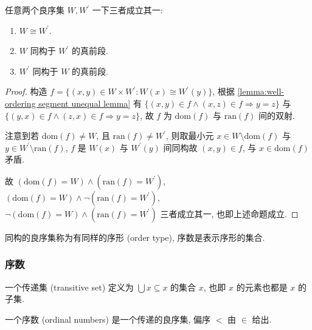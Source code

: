 \begin{theorem}
    \label{theorem:well-ordering segment equal theorem}
    任意两个良序集 \(W, W^\prime\) 一下三者成立其一:
    \begin{enumerate}
        \item \(W \cong W^\prime\).
        \item \(W\) 同构于 \(W^\prime\) 的真前段.
        \item \(W^\prime\) 同构于 \(W\) 的真前段.
    \end{enumerate}

    \begin{proof}
        构造 \(f = \{(x,y) \in W \times W^\prime : W(x) \cong W^\prime(y)\}\),
        根据 \ref{lemma:well-ordering segment unequal lemma} 有 \(\{(x,y) \in f \land (x,z) \in f \Rightarrow y = z\}\) 与
        \(\{(y,x) \in f \land (z,x) \in f \Rightarrow y=z\}\), 
        故 \(f\) 为 \(\mathrm{dom} (f)\) 与 \(\mathrm{ran} (f)\) 间的双射.

        注意到若 \(\mathrm{dom} (f) \neq W\), 且 \(\mathrm{ran} (f) \neq W^\prime\),
        则取最小元 \(x \in W \setminus \mathrm{dom} (f)\) 与 \(y \in W^\prime \setminus \mathrm{ran} (f)\),
        \(f\) 是 \(W(x)\) 与 \(W^\prime(y)\) 间同构故 \((x,y) \in f\), 与 \(x \in \mathrm{dom} (f)\) 矛盾.

        故 \((\mathrm{dom} (f) = W) \land (\mathrm{ran} (f) = W^\prime)\), \((\mathrm{dom} (f) = W) \land \neg(\mathrm{ran} (f) = W^\prime)\), 
        \(\neg(\mathrm{dom} (f) = W) \land (\mathrm{ran} (f) = W^\prime)\) 三者成立其一, 也即上述命题成立.
    \end{proof}
\end{theorem}

\begin{definition}
    同构的良序集称为有同样的序形 (order type), 序数是表示序形的集合.
\end{definition}

\subsubsection{序数}

\begin{definition}
    一个传递集 (transitive set) 定义为 \(\bigcup x \subseteq x\) 的集合 \(x\), 也即 \(x\) 的元素也都是 \(x\) 的子集.
\end{definition}

\begin{definition}
    \label{definition:ordinal}
    一个序数 (ordinal numbers) 是一个传递的良序集, 偏序 \(<\) 由 \(\in\) 给出.
\end{definition}

